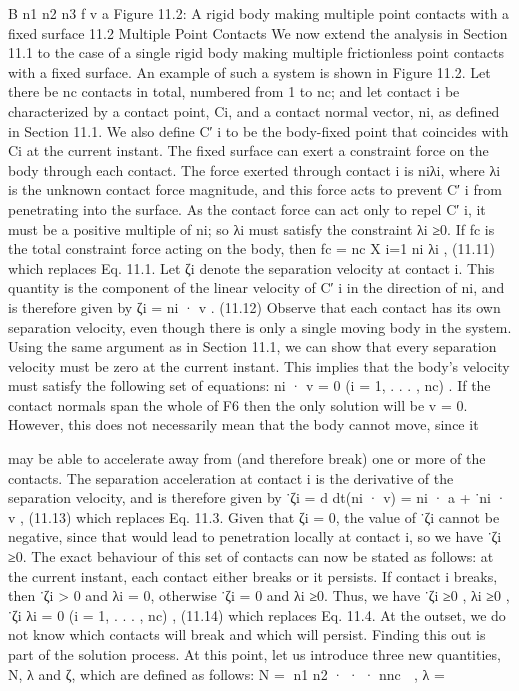 B n1 n2 n3 f v a Figure 11.2: A rigid body making multiple point contacts with a fixed surface 11.2 Multiple Point Contacts We now extend the analysis in Section 11.1 to the case of a single rigid body making multiple frictionless point contacts with a fixed surface. An example of such a system is shown in Figure 11.2. Let there be nc contacts in total, numbered from 1 to nc; and let contact i be characterized by a contact point, Ci, and a contact normal vector, ni, as defined in Section 11.1. We also define C′ i to be the body-fixed point that coincides with Ci at the current instant. The fixed surface can exert a constraint force on the body through each contact. The force exerted through contact i is niλi, where λi is the unknown contact force magnitude, and this force acts to prevent C′ i from penetrating into the surface. As the contact force can act only to repel C′ i, it must be a positive multiple of ni; so λi must satisfy the constraint λi ≥0. If fc is the total constraint force acting on the body, then fc = nc X i=1 ni λi , (11.11) which replaces Eq. 11.1. Let ζi denote the separation velocity at contact i. This quantity is the component of the linear velocity of C′ i in the direction of ni, and is therefore given by ζi = ni · v . (11.12) Observe that each contact has its own separation velocity, even though there is only a single moving body in the system. Using the same argument as in Section 11.1, we can show that every separation velocity must be zero at the current instant. This implies that the body’s velocity must satisfy the following set of equations: ni · v = 0 (i = 1, . . . , nc) . If the contact normals span the whole of F6 then the only solution will be v = 0. However, this does not necessarily mean that the body cannot move, since it

may be able to accelerate away from (and therefore break) one or more of the contacts. The separation acceleration at contact i is the derivative of the separation velocity, and is therefore given by ˙ζi = d dt(ni · v) = ni · a + ˙ni · v , (11.13) which replaces Eq. 11.3. Given that ζi = 0, the value of ˙ζi cannot be negative, since that would lead to penetration locally at contact i, so we have ˙ζi ≥0. The exact behaviour of this set of contacts can now be stated as follows: at the current instant, each contact either breaks or it persists. If contact i breaks, then ˙ζi > 0 and λi = 0, otherwise ˙ζi = 0 and λi ≥0. Thus, we have ˙ζi ≥0 , λi ≥0 , ˙ζi λi = 0 (i = 1, . . . , nc) , (11.14) which replaces Eq. 11.4. At the outset, we do not know which contacts will break and which will persist. Finding this out is part of the solution process. At this point, let us introduce three new quantities, N, λ and ζ, which are defined as follows: N = n1 n2 · · · nnc  , λ =

